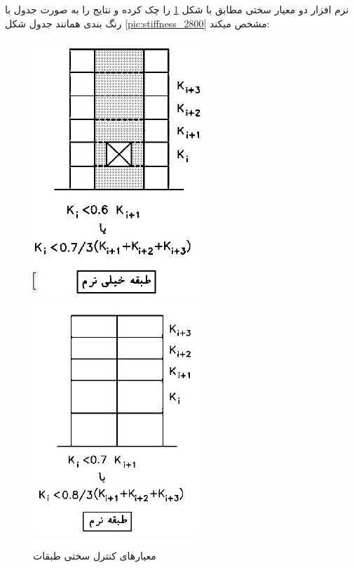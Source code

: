 نرم افزار دو معیار سختی مطابق با شکل 
\ref{pic:stiffness_low}
را چک کرده و نتایج را به صورت جدول با رنگ بندی همانند جدول شکل \ref{pic:stiffness_2800} مشخص میکند:

\begin{figure}[H]
    \centering
    \includegraphics[scale=0.7]{figures/stiffness3}
    \includegraphics[scale=0.7]{figures/stiffness2}
    \caption{معیارهای کنترل سختی طبقات}
    \label{pic:stiffness_low}
\end{figure}


